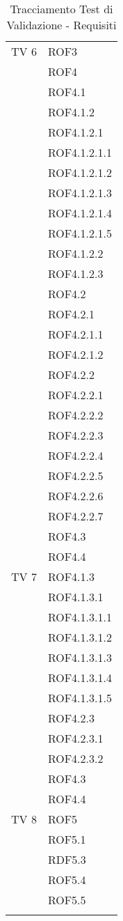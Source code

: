 \begin{center}
\begin{longtable}{|p{7cm}|p{7cm}|}
\midrule
TV 6 & ROF3\\ &  ROF4\\ &  ROF4.1\\ &  ROF4.1.2\\ &  ROF4.1.2.1\\ &  ROF4.1.2.1.1\\ &  ROF4.1.2.1.2\\ &  ROF4.1.2.1.3\\ &  ROF4.1.2.1.4\\ &  ROF4.1.2.1.5\\ &  ROF4.1.2.2\\ &  ROF4.1.2.3\\ &  ROF4.2\\ &  ROF4.2.1\\ &  ROF4.2.1.1\\ &  ROF4.2.1.2\\ &  ROF4.2.2\\ &  ROF4.2.2.1\\ &  ROF4.2.2.2\\ &  ROF4.2.2.3\\ &  ROF4.2.2.4\\ &  ROF4.2.2.5\\ &  ROF4.2.2.6\\ &  ROF4.2.2.7\\ &  ROF4.3\\ &  ROF4.4\\
\midrule
TV 7 & ROF4.1.3\\ &  ROF4.1.3.1\\ &  ROF4.1.3.1.1\\ &  ROF4.1.3.1.2\\ &  ROF4.1.3.1.3\\ &  ROF4.1.3.1.4\\ &  ROF4.1.3.1.5\\ &  ROF4.2.3\\ &  ROF4.2.3.1\\ &  ROF4.2.3.2\\ &  ROF4.3\\ &  ROF4.4\\
\midrule
TV 8 & ROF5\\ &  ROF5.1\\ &  RDF5.3\\ &  ROF5.4\\ &  ROF5.5\\

\bottomrule
\caption{Tracciamento Test di Validazione - Requisiti}
\label{tab:changelog}
\end{longtable}
\end{center}

